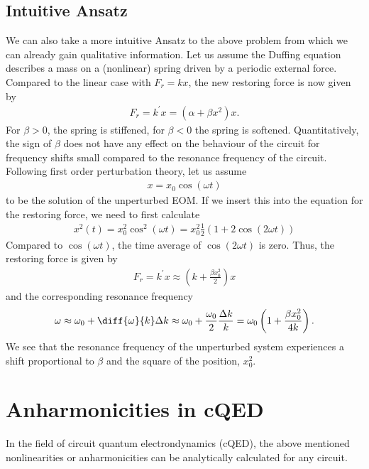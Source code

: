 \subsection{Intuitive Ansatz}
We can also take a more intuitive Ansatz to the above problem from which we can already gain qualitative information.
Let us assume the Duffing equation describes a mass on a (nonlinear) spring driven by a periodic external force.
Compared to the linear case with $F_r=kx$, the new restoring force is now given by 
\begin{align}
F_r = k^\prime x = (\alpha +\beta x^2)x.
\end{align}
For $\beta>0$, the spring is stiffened, for $\beta<0$ the spring is softened.
Quantitatively, the sign of $\beta$ does not have any effect on the behaviour of the circuit for frequency shifts small compared to the resonance frequency of the circuit.
Following first order perturbation theory, let us assume 
\begin{align}
x=x_0 \cos(\omega t)%
\end{align}
to be the solution of the unperturbed EOM.
If we insert this into the equation for the restoring force, we need to first calculate
\begin{align}
x^2(t) = x_0^2\cos^2(\omega t) = x_0^2\frac{1}{2}(1+2\cos(2\omega t))
\end{align}
Compared to $\cos(\omega t)$, the time average of $\cos(2\omega t)$ is zero.
Thus, the restoring force is given by
\begin{align}
F_r=k^\prime x \approx \left(k+\frac{\beta x_0^2}{2}\right)x
\end{align}
and the corresponding resonance frequency
\begin{align}
\omega \approx \omega_0 + \diff{\omega}{k}\Delta k \approx \omega_0 + \frac{\omega_0}{2}\frac{\Delta k}{k} = \omega_0 \left(1+\frac{\beta x_0^2}{4k}\right).
\end{align}
We see that the resonance frequency of the unperturbed system experiences a shift proportional to $\beta$ and the square of the position, $x_0^2$.

\section{Anharmonicities in cQED}

In the field of circuit quantum electrondynamics (cQED), the above mentioned nonlinearities or anharmonicities can be analytically calculated for any circuit.

